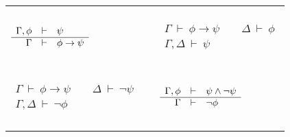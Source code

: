 \begin{tabular}{l c l}
\\ \\ 

\begin{tcolorbox}[width=4cm,title=CP,attach boxed title to top left]                                                                                                         
  $\begin{array}{r c l}
    \Gamma ,\phi & \vdash & \psi \\ \hline
    \Gamma & \vdash & \phi\to \psi
   \end{array} $
\end{tcolorbox}
& &
\begin{tcolorbox}[hbox,title=MP,attach boxed title to top left]                                                                                                        
$\begin{array}{c}
   \Gamma\:\vdash\:\phi\to \psi \qquad \Delta\:\vdash\:\phi \\ \hline
\Gamma ,\Delta \:\vdash\:\psi \end{array}$ \end{tcolorbox} 

 \\ \\
 
\begin{tcolorbox}[hbox,title=MT,attach boxed title to top left]                                                                                                       
$\begin{array}{c}
   \Gamma\:\vdash\:\phi\to \psi \qquad \Delta\:\vdash\:\neg\psi \\ \hline
   \Gamma ,\Delta\:\vdash\:\neg\phi \end{array}$  \end{tcolorbox}
&  &                        
\begin{tcolorbox}[width=4cm,title=RAA,attach boxed title to top left]                                                                                                      
$\begin{array}{r c l}
   \Gamma ,\phi &\vdash & \psi\wedge\neg\psi \\ \hline
   \Gamma & \vdash & \neg \phi  \end{array}$ \end{tcolorbox}

\\ \\ 


\end{tabular}
